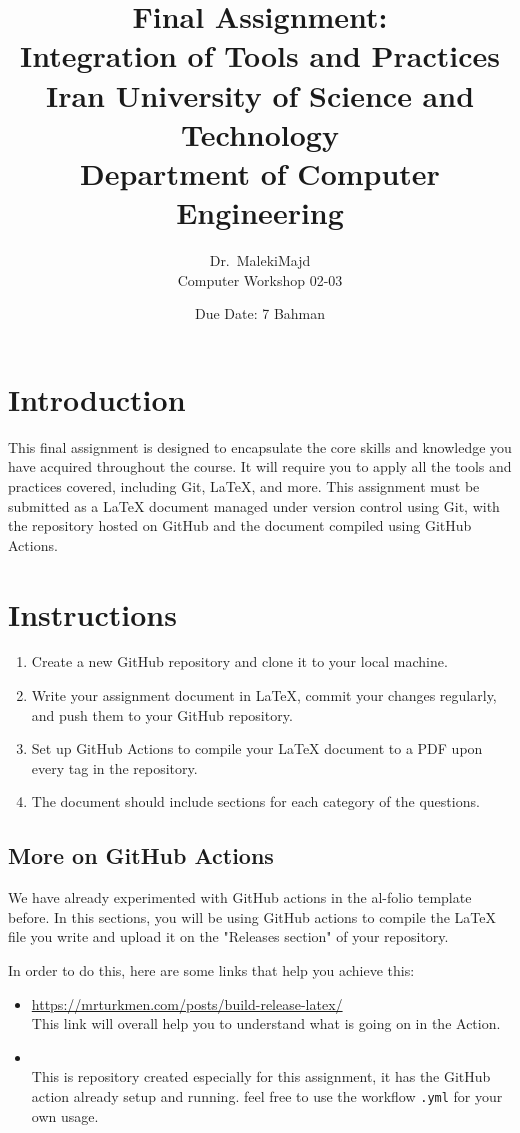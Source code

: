 \documentclass[12pt]{article}
\title{
	\vspace{2in}
	\textbf{Final Assignment:}\\
	\textbf{Integration of Tools and Practices}\\
	\large Iran University of Science and Technology\\
	\large Department of Computer Engineering\\
	\vspace{2in}
}
\author{
	\vspace{0.5in}
	Dr.\ MalekiMajd\\
	Computer Workshop 02-03\\
	\vspace{0.5in}
}
\date{Due Date: 7 Bahman}
\begin{document}
	
	\begin{titlepage}
		\maketitle
		\thispagestyle{empty}
	\end{titlepage}
	
	\newpage
	
	\section*{Introduction}
	This final assignment is designed to encapsulate the core skills and knowledge you have acquired throughout the course. It will require you to apply all the tools and practices covered, including Git, LaTeX, and more. This assignment must be submitted as a LaTeX document managed under version control using Git, with the repository hosted on GitHub and the document compiled using GitHub Actions.
	
	\section*{Instructions}
	\begin{enumerate}
		\item Create a new GitHub repository and clone it to your local machine.
		\item Write your assignment document in LaTeX, commit your changes regularly, and push them to your GitHub repository.
		\item Set up GitHub Actions to compile your LaTeX document to a PDF upon every tag in the repository.
		\item The document should include sections for each category of the questions.
	\end{enumerate}
	
	\subsection*{More on GitHub Actions}
	We have already experimented with GitHub actions in the al-folio template before. In this sections, you will be using GitHub actions to compile the LaTeX file you write and upload it on the "Releases section" of your repository.
	
	In order to do this, here are some links that help you achieve this:
	\begin{itemize}
		\item \url{https://mrturkmen.com/posts/build-release-latex/} \\
		This link will overall help you to understand what is going on in the Action.
		\item \url{} \\
		This is repository created especially for this assignment, it has the GitHub action already setup and running. feel free to use the workflow \texttt{.yml}
		for your own usage.
	\end{itemize}
	
\end{document}
